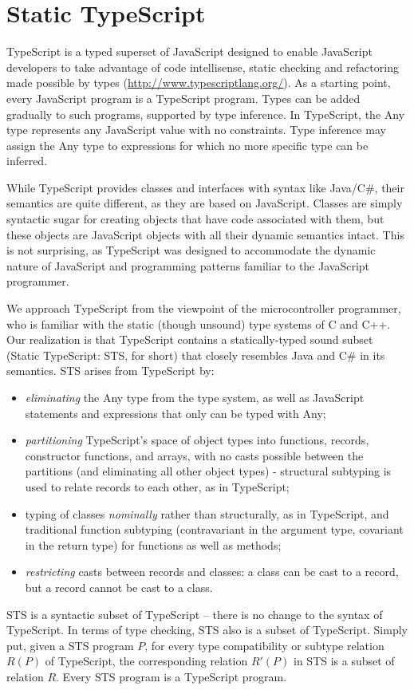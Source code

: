 \section{Static TypeScript}
\label{sec:sts}

TypeScript is a typed superset of JavaScript designed to enable JavaScript developers to take advantage of code 
intellisense, static checking and refactoring made possible by types (\url{http://www.typescriptlang.org/}). 
As a starting point, every JavaScript program is a TypeScript program.  Types can be added gradually to such programs, 
supported by type inference. In TypeScript, the Any type 
represents any JavaScript value with no constraints. Type inference may assign the Any type to expressions for which 
no more specific type can be inferred.

While TypeScript provides classes and interfaces with syntax like Java/C\#, their semantics
are quite different, as they are based on JavaScript.  Classes are simply syntactic sugar for creating objects that
have code associated with them, but these objects are JavaScript objects with all their dynamic semantics intact. This
is not surprising, as TypeScript was designed to accommodate the dynamic nature of JavaScript and programming patterns
familiar to the JavaScript programmer. 

We approach TypeScript from the viewpoint of the microcontroller programmer, who is 
familiar with the static (though unsound) type systems of C and C++. Our realization is that TypeScript contains a
statically-typed sound subset (Static TypeScript: STS, for short) that closely resembles Java and C\# in its semantics.
STS arises from TypeScript by:
\begin{itemize}
\item \emph{eliminating} the Any type from the type system, as well as JavaScript statements
and expressions that only can be typed with Any;
\item \emph{partitioning} TypeScript's space of object types into functions, records, constructor functions, and arrays, with no casts 
    possible between the partitions (and eliminating all other object types) - structural subtyping is used to relate records 
    to each other, as in TypeScript;
\item typing of classes \emph{nominally} rather than structurally, as in TypeScript, and traditional function subtyping (contravariant 
    in the argument type, covariant in the return type) for functions as well as methods;
\item \emph{restricting} casts between records and classes: a class can be cast to a record, but a record cannot be cast to a class.
\end{itemize}
STS is a syntactic subset of TypeScript -- there is no change to the syntax of TypeScript.
In terms of type checking, STS also is a subset of TypeScript. Simply put, given a STS program $P$,
for every type compatibility or subtype relation $R(P)$ of TypeScript, the corresponding relation $R'(P)$ in STS
is a subset of relation $R$. Every STS program is a TypeScript program. 

